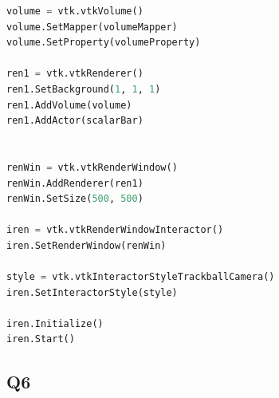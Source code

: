 \documentclass[11pt]{scrartcl}
\begin{document}
\begin{lstlisting}[language=Python]
volume = vtk.vtkVolume()
volume.SetMapper(volumeMapper)
volume.SetProperty(volumeProperty)

ren1 = vtk.vtkRenderer()
ren1.SetBackground(1, 1, 1)
ren1.AddVolume(volume)
ren1.AddActor(scalarBar)


renWin = vtk.vtkRenderWindow()
renWin.AddRenderer(ren1)
renWin.SetSize(500, 500)

iren = vtk.vtkRenderWindowInteractor()
iren.SetRenderWindow(renWin)

style = vtk.vtkInteractorStyleTrackballCamera()
iren.SetInteractorStyle(style)

iren.Initialize()
iren.Start()
\end{lstlisting}
\subsection{Q6}
\label{code:Q6}
\end{document}
